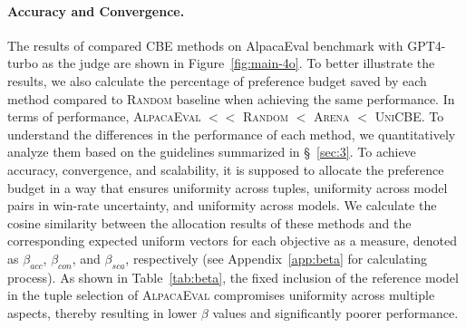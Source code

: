 \paragraph{Accuracy and Convergence.}
The results of compared CBE methods on AlpacaEval benchmark with GPT4-turbo as the judge are shown in Figure~\ref{fig:main-4o}. 
To better illustrate the results, we also calculate the percentage of preference budget saved by each method compared to \textsc{Random} baseline when achieving the same performance. 
In terms of performance, \textsc{AlpacaEval} $<<$ \textsc{Random} $<$ \textsc{Arena} $<$ \textsc{UniCBE}.
To understand the differences in the performance of each method, we quantitatively analyze them based on the guidelines summarized in \S~\ref{sec:3}. 
To achieve accuracy, convergence, and scalability, it is supposed  to allocate the preference budget in a way that ensures uniformity across tuples, uniformity across model pairs in win-rate uncertainty, and uniformity across models. 
We calculate the cosine similarity between the allocation results of these methods and the corresponding expected uniform vectors for each objective as a measure, denoted as $\beta_{acc}$, $\beta_{con}$, and $\beta_{sca}$, respectively (see Appendix~\ref{app:beta} for calculating process).
As shown in Table~\ref{tab:beta}, the fixed inclusion of the reference model in the tuple selection of \textsc{AlpacaEval} compromises uniformity across multiple aspects, thereby resulting in lower $\beta$ values and significantly poorer performance. 
